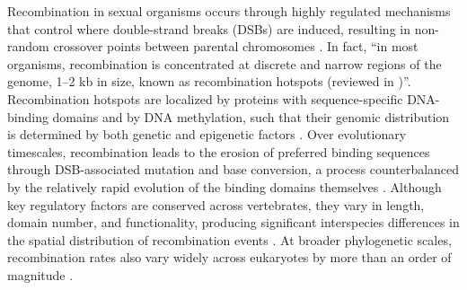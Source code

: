 Recombination in sexual organisms occurs through highly regulated mechanisms that control where double-strand breaks (DSBs) are induced, resulting in non-random crossover points between parental chromosomes \citep{stapley2017recombination}.
In fact, ``in most organisms, recombination is concentrated at discrete and narrow regions of the genome, 1--2 kb in size, known as recombination hotspots (reviewed in \citep{kauppi2004crossovers,arnheim2007mammalian,buard2007playing})''.
Recombination hotspots are localized by proteins with sequence-specific DNA-binding domains and by DNA methylation, such that their genomic distribution is determined by both genetic and epigenetic factors \citep{tiemannboege2017consequences}.
Over evolutionary timescales, recombination leads to the erosion of preferred binding sequences through DSB-associated mutation and base conversion, a process counterbalanced by the relatively rapid evolution of the binding domains themselves \citep{tiemannboege2017consequences}.
Although key regulatory factors are conserved across vertebrates, they vary in length, domain number, and functionality, producing significant interspecies differences in the spatial distribution of recombination events \citep{tiemannboege2017consequences}.
At broader phylogenetic scales, recombination rates also vary widely across eukaryotes by more than an order of magnitude \citep{stapley2017variation}.

